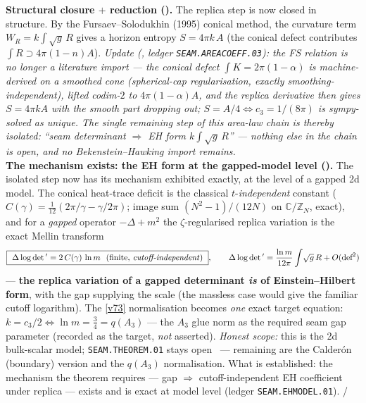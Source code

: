 \documentclass[11pt,a4paper]{article}
\newcommand{\cthree}{c_3}
\newcommand{\Z}{\mathbb Z}
\begin{document}
\begin{gapbox}
\smallskip\noindent\textbf{Structural closure $+$ reduction ().} The
replica step is now closed in structure. By the Fursaev--Solodukhin (1995) conical method, the curvature
term $W_R=k\!\int\!\sqrt g\,R$ gives a horizon entropy $S=4\pi k\,A$ (the conical defect contributes
$\int R\supset4\pi(1{-}n)A$). \emph{Update (, ledger
\texttt{SEAM.AREACOEFF.03}): the FS relation is no longer a literature import --- the conical defect
$\int K=2\pi(1{-}\alpha)$ is machine-derived on a smoothed cone (spherical-cap regularisation, exactly
smoothing-independent), lifted codim-$2$ to $4\pi(1{-}\alpha)A$, and the replica derivative then gives
$S=4\pi kA$ with the smooth part dropping out; $S=A/4\Leftrightarrow\cthree=1/(8\pi)$ is sympy-solved as
unique. The single remaining step of \emph{this area-law chain} is thereby isolated: ``seam determinant $\Rightarrow$
EH form $k\!\int\!\sqrt g\,R$'' --- nothing else in the chain is open, and no Bekenstein--Hawking import remains.}
\smallskip\\
\noindent\textbf{The mechanism exists: the EH form at the gapped-model level
().} The isolated step now has its mechanism exhibited exactly, at the
level of a gapped 2d model. The conical heat-trace deficit is the classical $t$-\emph{independent}
constant ($C(\gamma)=\tfrac1{12}(2\pi/\gamma-\gamma/2\pi)$; image sum $(N^2{-}1)/(12N)$ on
$\mathbb C/\Z_N$, exact), and for a \emph{gapped} operator $-\Delta+m^2$ the $\zeta$-regularised replica
variation is the exact Mellin transform
\[
  \boxed{\ \Delta\log\det{}'=2\,C(\gamma)\,\ln m\ \ \text{(finite, \emph{cutoff-independent})}\ },\qquad
  \Delta\log\det{}'=\frac{\ln m}{12\pi}\int\!\sqrt g\,R+O(\text{def}^2)
\]
--- \textbf{the replica variation of a gapped determinant \emph{is} of Einstein--Hilbert form}, with the
gap supplying the scale (the massless case would give the familiar cutoff logarithm). The \vref{v73}
normalisation becomes \emph{one} exact target equation: $k=\cthree/2\Leftrightarrow\ln m=\tfrac34=q(A_3)$
--- the $A_3$ glue norm as the required seam gap parameter (recorded as the target, \emph{not} asserted).
\emph{Honest scope:} this is the 2d bulk-scalar model; \texttt{SEAM.THEOREM.01} stays open \mO\ ---
remaining are the Calder\'on (boundary) version and the $q(A_3)$ normalisation. What is established: the
mechanism the theorem requires --- gap $\Rightarrow$ cutoff-independent EH coefficient under replica ---
exists and is exact at model level (ledger \texttt{SEAM.EHMODEL.01}). \mE/\mO

\end{gapbox}
\end{document}
